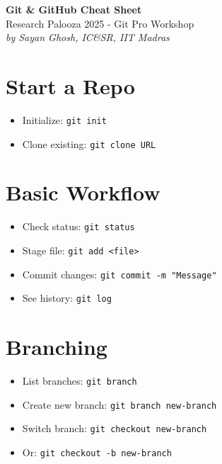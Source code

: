\documentclass[12pt,a4paper]{article}
\begin{document}
\begin{center}
    {\Huge \textbf{\textcolor{accent}{Git \& GitHub Cheat Sheet}}} \\[0.5em]
    {\large Research Palooza 2025 - Git Pro Workshop} \\
    {\small \textit{by Sayan Ghosh, IC\&SR, IIT Madras}}
\end{center}

\vspace{1em}


\section*{\textcolor{accent}{Start a Repo}}
\begin{itemize}
  \item Initialize: \texttt{git init}
  \item Clone existing: \texttt{git clone URL}
\end{itemize}


\section*{\textcolor{accent}{Basic Workflow}}
\begin{itemize}
  \item Check status: \texttt{git status}
  \item Stage file: \texttt{git add <file>}
  \item Commit changes: \texttt{git commit -m "Message"}
  \item See history: \texttt{git log}
\end{itemize}


\section*{\textcolor{accent}{Branching}}
\begin{itemize}
  \item List branches: \texttt{git branch}
  \item Create new branch: \texttt{git branch new-branch}
  \item Switch branch: \texttt{git checkout new-branch}
  \item Or: \texttt{git checkout -b new-branch}
\end{itemize}
\end{document}
